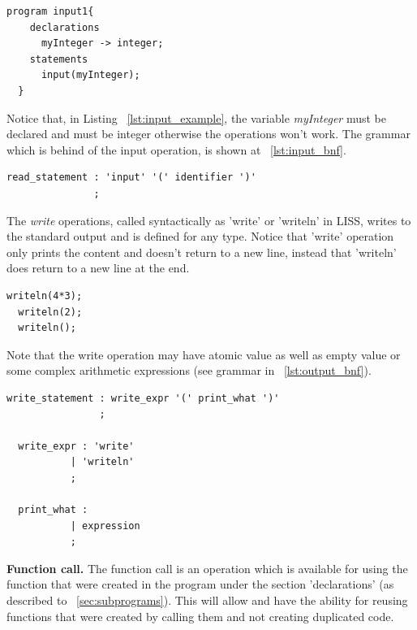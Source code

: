 \documentclass[
  oneside,
  11pt, a4paper,
  footinclude=true,
  headinclude=true,
  cleardoublepage=empty
]{scrbook}
\begin{document}
\begin{lstlisting}[caption={Example of input operation in LISS}, label={lst:input_example}]
  program input1{
    declarations
      myInteger -> integer;
    statements
      input(myInteger);
  }
\end{lstlisting}

Notice that, in Listing ~\ref{lst:input_example}, the variable \textit{myInteger} must be declared  and must be integer otherwise the operations won't work.
The grammar which is behind of the input operation, is shown at ~\ref{lst:input_bnf}.

\begin{lstlisting}[caption={BNF of input operation in LISS}, label={lst:input_bnf}]
 read_statement : 'input' '(' identifier ')'
               ; 
\end{lstlisting}

The \textit{write} operations, called syntactically as 'write' or 'writeln' in LISS, writes to the standard output and is defined for any type.
Notice that 'write' operation only prints the content and doesn't return to a new line, instead that 'writeln' does return to a new line at the end.

\begin{lstlisting}[caption={Example of output operations in LISS},label={lst:output_example}]
  writeln(4*3);
  writeln(2);
  writeln();
\end{lstlisting}

Note that the write operation may have atomic value as well as empty value or some complex arithmetic expressions (see grammar in ~\ref{lst:output_bnf}).

\begin{lstlisting}[caption={BNF of output operations in LISS},label={lst:output_bnf}]
  write_statement : write_expr '(' print_what ')'
                ;

  write_expr : 'write'
           | 'writeln'
           ;

  print_what :
           | expression
           ;
\end{lstlisting}

\textbf{Function call.} The function call is an operation which is available for using the function that were created in the program under the section 'declarations' (as described to ~\ref{sec:subprograms}).
This will allow and have the ability for reusing functions that were created by calling them and not creating duplicated code.
\end{document}
